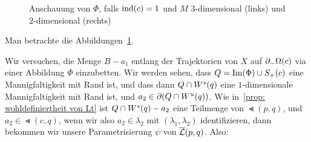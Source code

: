 \begin{bigproof}
\begin{figure}
        \caption{Anschauung von $\Phi$, falls ${ \operatorname{ind} } (c) = 1$ und $M$ $3$-dimensional 
        (links) und $2$-dimensional (rechts)}
        \label{fig: anschauung von phi}
    \end{figure}

    Man betrachte die Abbildungen~\ref{fig: anschauung von phi}.

    Wir versuchen, die Menge $B - a_1$ entlang der Trajektorien von $X$ auf ${ \partial }_- \Omega(c)$ via einer 
    Abbildung $\Phi$ einzubetten. Wir werden sehen, dass $Q = { \operatorname{Im} } (\Phi) \cup S_+(c)$ eine 
    Mannigfaltigkeit mit Rand ist, und dass dann $Q \cap { W^s } (q)$ eine $1$-dimensionale
    Mannigfaltigkeit mit Rand ist, und $a_2 \in { \partial } (Q \cap { W^u } (q))$. Wie 
    in~\ref{prop: wohldefiniertheit von Lt} ist $Q \cap { W^s } (q) - a_2$ eine Teilmenge von 
    $\Lt (p, q)$, und $a_2 \in \Lt (c, q)$, wenn wir also $a_2 \in \lambda_2$ mit 
    $(\lambda_1, \lambda_2)$ identifizieren, dann bekommen wir unsere Parametrisierung 
    $\psi$ von ${\overline{\mathcal{L}} } (p, q)$. 
    Also:


\end{bigproof}
